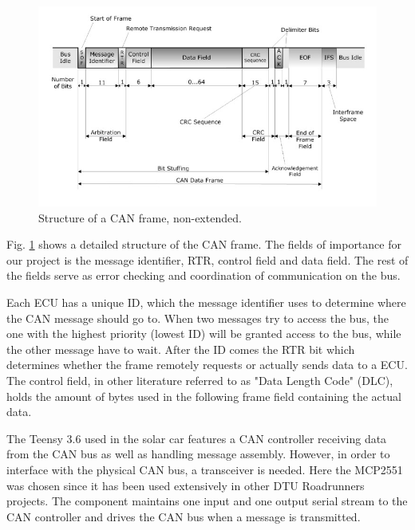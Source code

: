\documentclass[a4paper,conference]{IEEEtran}
\begin{document}
\begin{figure}
    \centering
    \includegraphics[width=\linewidth]{documentation/images/detailed-can-data-frame-architecture.jpg}
    \caption{Structure of a CAN frame, non-extended.}
    \label{fig:CANframe}
\end{figure}

Fig. \ref{fig:CANframe} shows a detailed structure of the CAN frame. The fields of importance for our project is the message identifier, RTR, control field and data field. The rest of the fields serve as error checking and coordination of communication on the bus.

Each ECU has a unique ID, which the message identifier uses to determine where the CAN message should go to. When two messages try to access the bus, the one with the highest priority (lowest ID) will be granted access to the bus, while the other message have to wait. After the ID comes the RTR bit which determines whether the frame remotely requests or actually sends data to a ECU. The control field, in other literature referred to as "Data Length Code" (DLC), holds the amount of bytes used in the following frame field containing the actual data\cite{DS_ISO}\cite{css}.


The Teensy 3.6 used in the solar car features a CAN controller receiving data from the CAN bus as well as handling message assembly. However, in order to interface with the physical CAN bus, a transceiver is needed. Here the MCP2551 was chosen since it has been used extensively in other DTU Roadrunners projects. The component maintains one input and one output serial stream to the CAN controller and drives the CAN bus when a message is transmitted.
\end{document}

